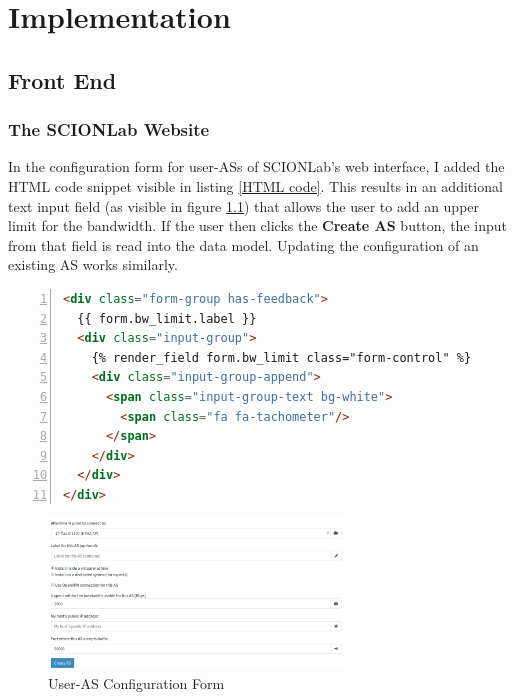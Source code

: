 \chapter{Implementation} \label{Implementation}

\section{Front End}

\subsection{The SCIONLab Website}

In the configuration form for user-\acsp{AS} of \acs{SCIONLab}'s web interface, I added the \ac{HTML} code snippet visible in listing \ref{HTML code}. This results in an additional text input field (as visible in figure \ref{User-AS Configuration Form}) that allows the user to add an upper limit for the bandwidth. If the user then clicks the \textbf{Create \acs{AS}} button, the input from that field is read into the data model. Updating the configuration of an existing \acs{AS} works similarly.

\begin{lstlisting}[language=html, caption = HTML code snippet of the bandwidth field from user\_as\_form.html, captionpos=b, numbers=left, frame=single, breaklines=true, breakatwhitespace=true, showstringspaces=false, label=HTML code]
<div class="form-group has-feedback">
  {{ form.bw_limit.label }}
  <div class="input-group">
    {% render_field form.bw_limit class="form-control" %}
    <div class="input-group-append">
      <span class="input-group-text bg-white">
        <span class="fa fa-tachometer"/>
      </span>
    </div>
  </div>
</div>
\end{lstlisting}

\begin{figure}[H]
	\includegraphics[width=0.7\textwidth]{img/user_as_form.png}
	\centering
	\caption{User-AS Configuration Form}
	\label{User-AS Configuration Form}
\end{figure}

